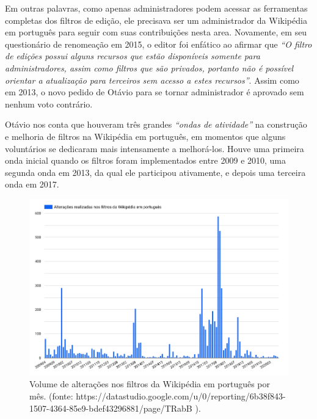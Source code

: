 Em outras palavras, como apenas administradores podem acessar as ferramentas completas dos filtros de edição, ele precisava ser um administrador da Wikipédia em português para seguir com suas contribuições nesta area. Novamente, em seu questionário de renomeação em 2015, o editor foi enfático ao afirmar que \textit{``O filtro de edições possui alguns recursos que estão disponíveis somente para administradores, assim como filtros que são privados, portanto não é possível orientar a atualização para terceiros sem acesso a estes recursos''}. Assim como em 2013, o novo pedido de Otávio para se tornar administrador é aprovado sem nenhum voto contrário.


Otávio nos conta que houveram três grandes \textit{``ondas de atividade''} na construção e melhoria de filtros na Wikipédia em português, em momentos que alguns voluntários se dedicaram mais intensamente a melhorá-los. Houve uma primeira onda inicial quando os filtros foram implementados entre 2009 e 2010, uma segunda onda em 2013, da qual ele participou ativamente, e depois uma terceira onda em 2017. 

\begin{figure}[H]
    \centering
    \includegraphics[width=1\textwidth]{Images/grafico_alteracoes_filtros.png}
    \caption{Volume de alterações nos filtros da Wikipédia em português por mês. (fonte: https://datastudio.google.com/u/0/reporting/6b38f843-1507-4364-85e9-bdef43296881/page/TRabB ).}
    \label{fig:grafico_alteracoes_filtros}
\end{figure}

